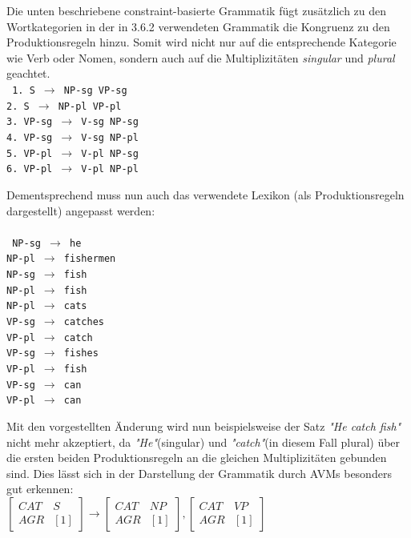 \documentclass[12pt]{report}
\begin{document}
Die unten beschriebene constraint-basierte Grammatik fügt zusätzlich zu den Wortkategorien in der in 3.6.2 verwendeten Grammatik die Kongruenz zu den Produktionsregeln hinzu. Somit wird nicht nur auf die entsprechende Kategorie wie Verb oder Nomen, sondern auch auf die Multiplizitäten \textit{singular} und \textit{plural} geachtet. \newline
\\
\tt
1. S $\rightarrow$ NP-sg VP-sg\\
2. S $\rightarrow$ NP-pl VP-pl\\
3. VP-sg $\rightarrow$ V-sg NP-sg\\
4. VP-sg $\rightarrow$ V-sg NP-pl\\
5. VP-pl $\rightarrow$ V-pl NP-sg\\
6. VP-pl $\rightarrow$ V-pl NP-pl\\
\rm

Dementsprechend muss nun auch das verwendete Lexikon (als Produktionsregeln dargestellt) angepasst werden:\\
\\
\tt
NP-sg $\rightarrow$ he\\
NP-pl $\rightarrow$ fishermen\\
NP-sg $\rightarrow$ fish\\
NP-pl $\rightarrow$ fish\\
NP-pl $\rightarrow$ cats\\
VP-sg $\rightarrow$ catches\\
VP-pl $\rightarrow$ catch\\
VP-sg $\rightarrow$ fishes\\
VP-pl $\rightarrow$ fish\\
VP-sg $\rightarrow$ can\\
VP-pl $\rightarrow$ can\\
\rm

Mit den vorgestellten Änderung wird nun beispielsweise der Satz \textit{"He catch fish"} nicht mehr akzeptiert, da \textit{"He"}(singular) und \textit{"catch"}(in diesem Fall plural) über die ersten beiden Produktionsregeln an die gleichen Multiplizitäten gebunden sind. 
Dies lässt sich in der Darstellung der Grammatik durch AVMs besonders gut erkennen:\\

$\begin{bmatrix} 
CAT & S \\
AGR & [1]
\end{bmatrix} 
\rightarrow
\begin{bmatrix} 
CAT & NP \\
AGR & [1]
\end{bmatrix},
\begin{bmatrix} 
CAT & VP \\
AGR & [1] 
\end{bmatrix}$ \\
\end{document}
